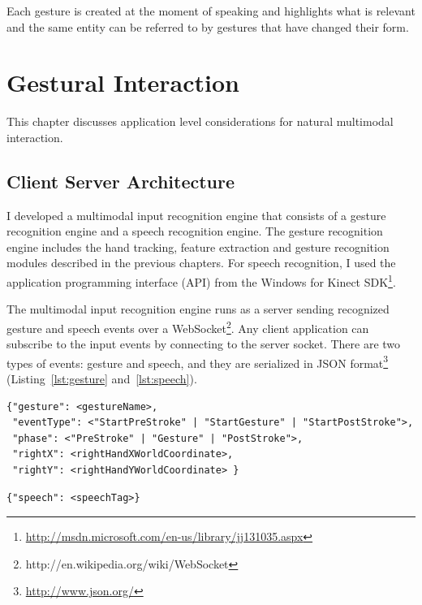 \begin{savequote}[120mm]
Each gesture is created at the moment of speaking and highlights what is
relevant and the same entity can be referred to by gestures that have changed
their form.
\end{savequote}
\chapter{Gestural Interaction}
This chapter discusses application level considerations for natural multimodal
interaction.

\section{Client Server Architecture}
I developed a multimodal input recognition engine that consists of a gesture
recognition engine and a speech recognition engine. The gesture recognition
engine includes the hand tracking, feature extraction and gesture recognition
modules described in the previous chapters.
For speech recognition, I used the application programming interface (API) from
the Windows for Kinect SDK\footnote{\url{http://msdn.microsoft.com/en-us/library/jj131035.aspx}}.

The multimodal input recognition engine runs as a server sending recognized
gesture and speech events over a WebSocket\footnote{http://en.wikipedia.org/wiki/WebSocket}. Any client
application can subscribe to the input events by connecting to the server
socket. There are two types of events: gesture and speech, and they are
serialized in JSON format\footnote{\url{http://www.json.org/}}
(Listing~\ref{lst:gesture} and~\ref{lst:speech}).

\begin{lstlisting}[caption={Gesture event JSON object}, label={lst:gesture}]
{"gesture": <gestureName>, 
 "eventType": <"StartPreStroke" | "StartGesture" | "StartPostStroke">,
 "phase": <"PreStroke" | "Gesture" | "PostStroke">,
 "rightX": <rightHandXWorldCoordinate>,
 "rightY": <rightHandYWorldCoordinate> } 
\end{lstlisting}

\begin{lstlisting}[caption={Speech event JSON object}, label={lst:speech}]
{"speech": <speechTag>}
\end{lstlisting}

